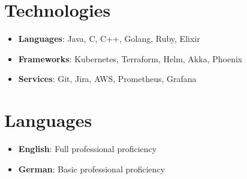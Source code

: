 \documentclass[a4paper,12pt]{article}
\newcommand{\resumeItem}[2]{
  \item\small{
    \textbf{#1}{: #2 \vspace{-2pt}}
  }
}
\newcommand{\resumeSubItem}[2]{\resumeItem{#1}{#2}\vspace{0pt}}
\newcommand{\resumeSubHeadingListStart}{\begin{itemize}[leftmargin=*]}
\newcommand{\resumeSubHeadingListEnd}{\end{itemize}}
\begin{document}
\section{Technologies}
  \resumeSubHeadingListStart
    \resumeSubItem{Languages}{
      Java, C, C++, Golang, Ruby, Elixir
    }
    \resumeSubItem{Frameworks}{
      Kubernetes, Terraform, Helm, Akka, Phoenix
    }
    \resumeSubItem{Services}{
      Git, Jira, AWS, Prometheus, Grafana
    }
  \resumeSubHeadingListEnd


\section{Languages}
  \resumeSubHeadingListStart
    \resumeSubItem{English}{
      Full professional proficiency
    }
    \resumeSubItem{German}{
      Basic professional proficiency
    }
  \resumeSubHeadingListEnd

\end{document}
